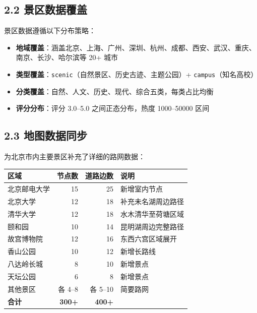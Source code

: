 \documentclass[12pt,a4paper]{article}
\begin{document}
\subsection*{2.2 景区数据覆盖}

景区数据遵循以下分布策略：

\begin{itemize}[leftmargin=2em]
    \item \textbf{地域覆盖}：涵盖北京、上海、广州、深圳、杭州、成都、西安、武汉、重庆、南京、长沙、哈尔滨等 20+ 城市
    \item \textbf{类型覆盖}：\texttt{scenic}（自然景区、历史古迹、主题公园）+ \texttt{campus}（知名高校）
    \item \textbf{分类覆盖}：自然、人文、历史、现代、综合五类，每类占比均衡
    \item \textbf{评分分布}：评分 3.0--5.0 之间正态分布，热度 1000--50000 区间
\end{itemize}

\subsection*{2.3 地图数据同步}

为北京市内主要景区补充了详细的路网数据：

\begin{center}
\begin{tabular}{l r r l}
    \toprule
    \bfseries 区域 & \bfseries 节点数 & \bfseries 道路边数 & \bfseries 说明 \\
    \midrule
    北京邮电大学 & 15 & 25 & 新增室内节点 \\
    北京大学 & 12 & 18 & 补充未名湖周边路径 \\
    清华大学 & 12 & 18 & 水木清华至荷塘区域 \\
    颐和园 & 10 & 14 & 昆明湖周边完整路径 \\
    故宫博物院 & 12 & 16 & 东西六宫区域展开 \\
    香山公园 & 10 & 12 & 新增长路线 \\
    八达岭长城 & 8 & 10 & 新增景点 \\
    天坛公园 & 6 & 8 & 新增景点 \\
    其他景区 & 各 4--8 & 各 5--10 & 简要路网 \\
    \midrule
    \textbf{合计} & \textbf{300+} & \textbf{400+} & \\
    \bottomrule
\end{tabular}
\end{center}
\end{document}
